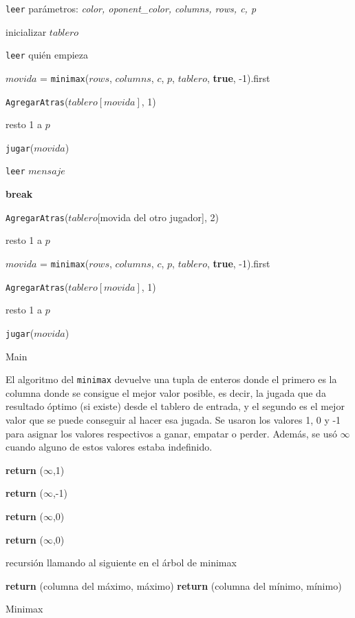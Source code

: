 \documentclass[A4paper,oneside,fleqn,11pt]{article}
\theoremstyle{definition}
\begin{document}
\begin{algorithm}
	\texttt{leer} parámetros: \textit{color, oponent\_color, columns, rows, c, p}
	
    inicializar $tablero$

	\texttt{leer} quién empieza

		{
		$movida$ = \texttt{minimax}($rows$, $columns$, $c$, $p$, $tablero$, \textbf{true}, -1).first

		\texttt{AgregarAtras}($tablero[movida]$, 1)

		resto 1 a $p$

		\texttt{jugar}($movida$)		
		}

    	{
    	\texttt{leer} $mensaje$

        	{
        	\textbf{break}
            }

        \texttt{AgregarAtras}($tablero$[movida del otro jugador], 2)        	

		resto 1 a $p$

        $movida$ = \texttt{minimax}($rows$, $columns$, $c$, $p$, $tablero$, \textbf{true}, -1).first

        \texttt{AgregarAtras}($tablero[movida]$, 1)

        resto 1 a $p$

    	\texttt{jugar}($movida$)
    	}
    \caption{Main}   
\end{algorithm}

El algoritmo del \texttt{minimax} devuelve una tupla de enteros donde el primero es la columna donde se consigue el mejor valor posible, es decir, la jugada  que da resultado óptimo (si existe) desde el tablero de entrada, y el segundo es el mejor valor que se puede conseguir al hacer esa jugada. Se usaron los valores 1, 0 y -1 para asignar los valores respectivos a ganar, empatar o perder. Además, se usó $\infty$ cuando alguno de estos valores estaba indefinido.


\begin{algorithm}


    
			{
			\textbf{return} ($\infty$,1)
			}

			{
			\textbf{return} ($\infty$,-1)
			}

			{
			\textbf{return} ($\infty$,0)
			}

			{
		    \textbf{return} ($\infty$,0)
		    }
		
		recursión llamando al siguiente en el árbol de minimax
		
			{
		    \textbf{return} (columna del máximo, máximo)
			}
			{
		    \textbf{return} (columna del mínimo, mínimo)
			}

\caption{Minimax}
\end{algorithm}
\end{document}
